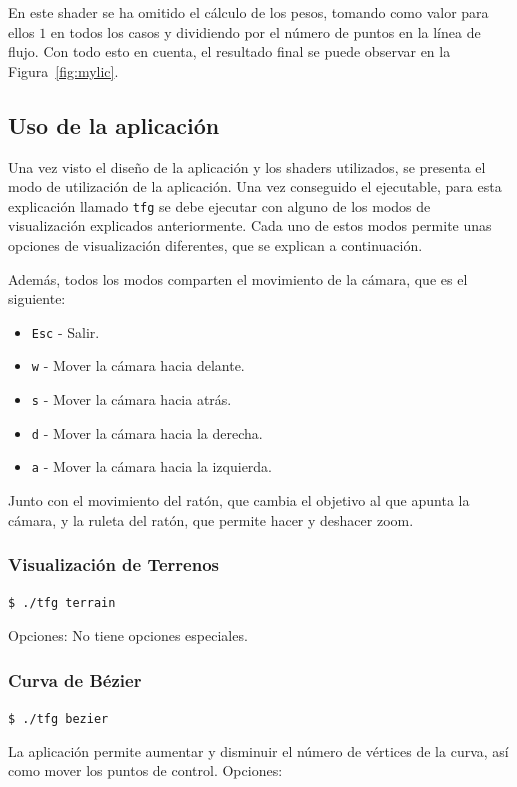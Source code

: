En este shader se ha omitido el cálculo de los pesos, tomando como valor para
ellos $1$ en todos los casos y dividiendo por el número de puntos en la línea
de flujo. Con todo esto en cuenta, el resultado final se puede observar en la
Figura~\ref{fig:mylic}.

\subsection{Uso de la aplicación}
\label{subsection:uso}

Una vez visto el diseño de la aplicación y los shaders utilizados, se presenta
el modo de utilización de la aplicación. Una vez conseguido el ejecutable, para
esta explicación llamado \verb|tfg| se debe ejecutar con alguno de los modos de
visualización explicados anteriormente. Cada uno de estos modos permite unas
opciones de visualización diferentes, que se explican a continuación.

Además, todos los modos comparten el movimiento de la cámara, que es el
siguiente:

\begin{itemize}
		\item \verb|Esc| - Salir.
		\item \verb|w| - Mover la cámara hacia delante.
		\item \verb|s| - Mover la cámara hacia atrás.
		\item \verb|d| - Mover la cámara hacia la derecha.
		\item \verb|a| - Mover la cámara hacia la izquierda.
\end{itemize}

Junto con el movimiento del ratón, que cambia el objetivo al que apunta la
cámara, y la ruleta del ratón, que permite hacer y deshacer zoom.

\subsubsection{Visualización de Terrenos}

\verb|$ ./tfg terrain|

Opciones: No tiene opciones especiales.

\subsubsection{Curva de Bézier}

\verb|$ ./tfg bezier|

La aplicación permite aumentar y disminuir el número de vértices de la curva,
así como mover los puntos de control.
Opciones:


